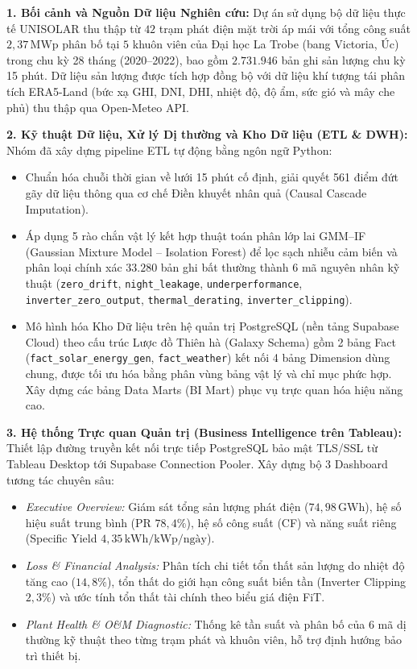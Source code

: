 \documentclass[12pt, a4paper]{report}
\begin{document}
\textbf{1. Bối cảnh và Nguồn Dữ liệu Nghiên cứu:}
Dự án sử dụng bộ dữ liệu thực tế UNISOLAR thu thập từ $42$ trạm phát điện mặt trời áp mái với tổng công suất $2{,}37\,\text{MWp}$ phân bố tại $5$ khuôn viên của Đại học La Trobe (bang Victoria, Úc) trong chu kỳ 28 tháng (2020--2022), bao gồm $2.731.946$ bản ghi sản lượng chu kỳ 15 phút. Dữ liệu sản lượng được tích hợp đồng bộ với dữ liệu khí tượng tái phân tích ERA5-Land (bức xạ GHI, DNI, DHI, nhiệt độ, độ ẩm, sức gió và mây che phủ) thu thập qua Open-Meteo API.

\textbf{2. Kỹ thuật Dữ liệu, Xử lý Dị thường và Kho Dữ liệu (ETL \& DWH):}
Nhóm đã xây dựng pipeline ETL tự động bằng ngôn ngữ Python:
\begin{itemize}[noitemsep]
    \item Chuẩn hóa chuỗi thời gian về lưới 15 phút cố định, giải quyết 561 điểm đứt gãy dữ liệu thông qua cơ chế Điền khuyết nhân quả (Causal Cascade Imputation).
    \item Áp dụng 5 rào chắn vật lý kết hợp thuật toán phân lớp lai GMM--IF (Gaussian Mixture Model -- Isolation Forest) để lọc sạch nhiễu cảm biến và phân loại chính xác $33.280$ bản ghi bất thường thành 6 mã nguyên nhân kỹ thuật (\texttt{zero\_drift}, \texttt{night\_leakage}, \texttt{underperformance}, \texttt{inverter\_zero\_output}, \texttt{thermal\_derating}, \texttt{inverter\_clipping}).
    \item Mô hình hóa Kho Dữ liệu trên hệ quản trị PostgreSQL (nền tảng Supabase Cloud) theo cấu trúc Lược đồ Thiên hà (Galaxy Schema) gồm 2 bảng Fact (\texttt{fact\_solar\_energy\_gen}, \texttt{fact\_weather}) kết nối 4 bảng Dimension dùng chung, được tối ưu hóa bằng phân vùng bảng vật lý và chỉ mục phức hợp. Xây dựng các bảng Data Marts (BI Mart) phục vụ trực quan hóa hiệu năng cao.
\end{itemize}

\textbf{3. Hệ thống Trực quan Quản trị (Business Intelligence trên Tableau):}
Thiết lập đường truyền kết nối trực tiếp PostgreSQL bảo mật TLS/SSL từ Tableau Desktop tới Supabase Connection Pooler. Xây dựng bộ 3 Dashboard tương tác chuyên sâu:
\begin{itemize}[noitemsep]
    \item \textit{Executive Overview:} Giám sát tổng sản lượng phát điện ($74{,}98\,\text{GWh}$), hệ số hiệu suất trung bình (PR $78{,}4\%$), hệ số công suất (CF) và năng suất riêng (Specific Yield $4{,}35\,\text{kWh/kWp/ngày}$).
    \item \textit{Loss \& Financial Analysis:} Phân tích chi tiết tổn thất sản lượng do nhiệt độ tăng cao ($14{,}8\%$), tổn thất do giới hạn công suất biến tần (Inverter Clipping $2{,}3\%$) và ước tính tổn thất tài chính theo biểu giá điện FiT.
    \item \textit{Plant Health \& O\&M Diagnostic:} Thống kê tần suất và phân bố của 6 mã dị thường kỹ thuật theo từng trạm phát và khuôn viên, hỗ trợ định hướng bảo trì thiết bị.
\end{itemize}
\end{document}
